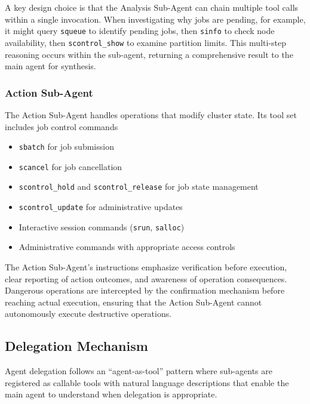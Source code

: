 A key design choice is that the Analysis Sub-Agent can chain multiple tool calls within a single invocation. When investigating why jobs are pending, for example, it might query \texttt{squeue} to identify pending jobs, then \texttt{sinfo} to check node availability, then \texttt{scontrol\_show} to examine partition limits. This multi-step reasoning occurs within the sub-agent, returning a comprehensive result to the main agent for synthesis.

\subsubsection{Action Sub-Agent}

The Action Sub-Agent handles operations that modify cluster state. Its tool set includes job control commands 
\begin{itemize}
    \item \texttt{sbatch} for job submission
    \item \texttt{scancel} for job cancellation
    \item \texttt{scontrol\_hold} and \texttt{scontrol\_release} for job state management
    \item \texttt{scontrol\_update} for administrative updates
    \item Interactive session commands (\texttt{srun}, \texttt{salloc})
    \item Administrative commands with appropriate access controls
\end{itemize}


The Action Sub-Agent's instructions emphasize verification before execution, clear reporting of action outcomes, and awareness of operation consequences. Dangerous operations are intercepted by the confirmation mechanism before reaching actual execution, ensuring that the Action Sub-Agent cannot autonomously execute destructive operations.

\subsection{Delegation Mechanism}

Agent delegation follows an ``agent-as-tool'' pattern where sub-agents are registered as callable tools with natural language descriptions that enable the main agent to understand when delegation is appropriate.

